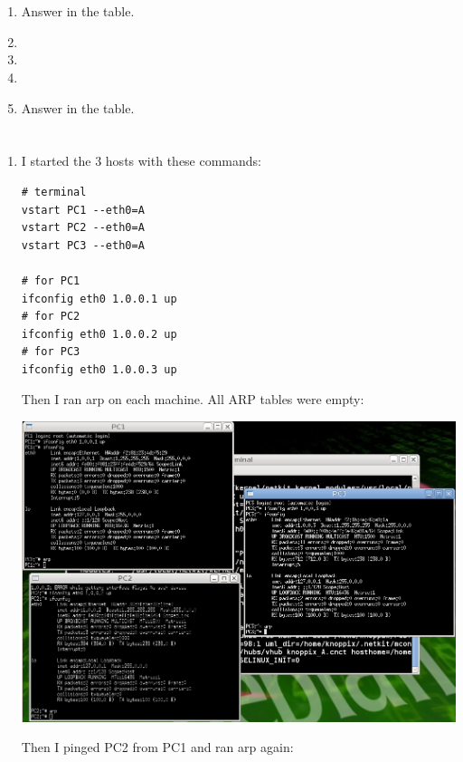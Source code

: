 \documentclass[12pt, a4paper]{article}
\begin{document}
\section{} %
\begin{enumerate}
	\item %
	Answer in the table.

	\item %
	\item %
	\item %
	\item %
	Answer in the table.
\end{enumerate}

\section{} %
\begin{enumerate}[a]
	\item %
	I started the 3 hosts with these commands:
	\begin{lstlisting}
# terminal
vstart PC1 --eth0=A
vstart PC2 --eth0=A
vstart PC3 --eth0=A

# for PC1
ifconfig eth0 1.0.0.1 up
# for PC2
ifconfig eth0 1.0.0.2 up
# for PC3
ifconfig eth0 1.0.0.3 up
	\end{lstlisting}

	Then I ran arp on each machine. All ARP tables were empty:

	\includegraphics[width=\linewidth]{screenshots/screen1}

	Then I pinged PC2 from PC1 and ran arp again:


\end{enumerate}
\end{document}
